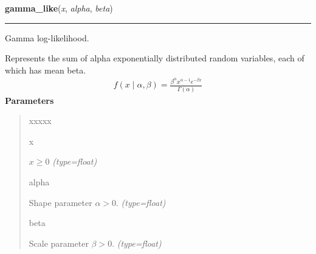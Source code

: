     \vspace{0.5ex}

\hspace{.8\funcindent}\begin{boxedminipage}{\funcwidth}

    \raggedright \textbf{gamma\_like}(\textit{x}, \textit{alpha}, \textit{beta})

    \vspace{-1.5ex}

    \rule{\textwidth}{1pt}
\setlength{\parskip}{2ex}

Gamma log-likelihood.

Represents the sum of alpha exponentially distributed random variables, each
of which has mean beta.
\begin{equation*}\begin{split}f(x \mid \alpha, \beta) = \frac{\beta^{\alpha}x^{\alpha-1}e^{-\beta x}}{\Gamma(\alpha)}\end{split}\end{equation*}\setlength{\parskip}{1ex}
      \textbf{Parameters}
      \vspace{-1ex}

      \begin{quote}
        \begin{Ventry}{xxxxx}

          \item[x]


$x \ge 0$
            {\it (type=float)}

          \item[alpha]


Shape parameter $\alpha > 0$.
            {\it (type=float)}

          \item[beta]


Scale parameter $\beta > 0$.
            {\it (type=float)}

        \end{Ventry}

      \end{quote}

    \end{boxedminipage}

    \label{pymc:distributions:geometric_like}

    \vspace{0.5ex}

